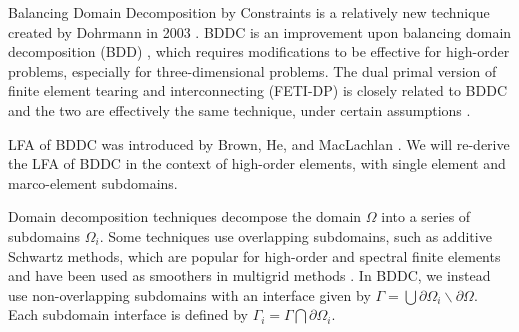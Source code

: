 Balancing Domain Decomposition by Constraints is a relatively new technique created by Dohrmann in 2003 \cite{dohrmann2003preconditioner}.
BDDC is an improvement upon balancing domain decomposition (BDD) \cite{mandel1993balancing}, which requires modifications to be effective for high-order problems, especially for three-dimensional problems.
The dual primal version of finite element tearing and interconnecting (FETI-DP) \cite{farhat2000scalable} is closely related to BDDC and the two are effectively the same technique, under certain assumptions \cite{mandel2007bddc}.

LFA of BDDC was introduced by Brown, He, and MacLachlan \cite{brown2019local}.
We will re-derive the LFA of BDDC in the context of high-order elements, with single element and marco-element subdomains.

Domain decomposition techniques decompose the domain $\Omega$ into a series of subdomains $\Omega_i$.
Some techniques use overlapping subdomains, such as additive Schwartz methods, which are popular for high-order and spectral finite elements \cite{fischer1997overlapping} and have been used as smoothers in multigrid methods \cite{fischer2005hybrid}.
In BDDC, we instead use non-overlapping subdomains with an interface given by $\Gamma = \bigcup \partial \Omega_i \backslash \partial \Omega$.
Each subdomain interface is defined by $\Gamma_i = \Gamma \bigcap \partial \Omega_i$.
